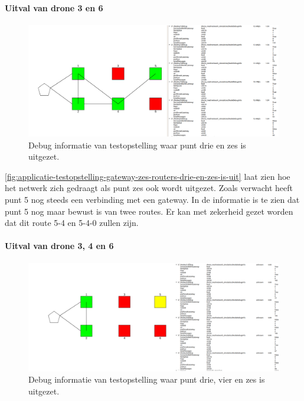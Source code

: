 \documentclass[a4paper, 11pt, oneside]{report}
\begin{document}
\paragraph{Uitval van drone 3 en 6}
\begin{figure}[H]
	\begin{center}\includegraphics[width=\linewidth]{Afbeeldingen/testopstelling1_drie_en_zes_is_uit.png}\end{center}
	\caption{Debug informatie van testopstelling waar punt drie en zes is uitgezet.}
	\label{fig:applicatie-testopstelling-gateway-zes-routers-drie-en-zes-is-uit}
\end{figure}

\autoref{fig:applicatie-testopstelling-gateway-zes-routers-drie-en-zes-is-uit} laat zien hoe het netwerk zich gedraagt als punt zes ook wordt uitgezet.
Zoals verwacht heeft punt 5 nog steeds een verbinding met een gateway.
In de informatie is te zien dat punt 5 nog maar bewust is van twee routes. 
Er kan met zekerheid gezet worden dat dit route 5-4 en 5-4-0 zullen zijn.

\paragraph{Uitval van drone 3, 4 en 6}
\begin{figure}[H]
	\begin{center}\includegraphics[width=\linewidth]{Afbeeldingen/testopstellingmetzes_drie-vier-zes-uit.png}\end{center}
	\caption{Debug informatie van testopstelling waar punt drie, vier en zes is uitgezet.}
	\label{fig:applicatie-testopstelling-gateway-zes-routers-drie-vier-en-zes-is-uit}
\end{figure}
\end{document}
